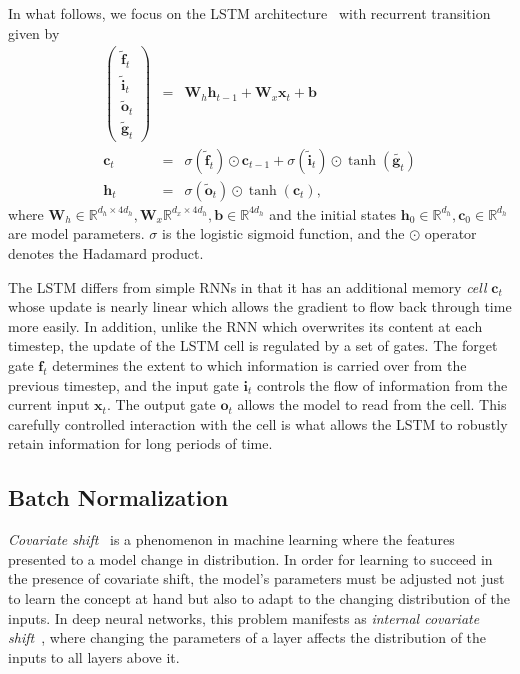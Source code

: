 \documentclass{article} %
\newcommand{\vect}[1]{\mathbf{#1}}
\newcommand{\mat}[1]{\mathbf{#1}}
\newcommand{\ewprod}{\odot}
\newcommand{\reals}{\mathbb{R}}
\begin{document}
In what follows, we focus on the LSTM architecture~\citep{lstm} with recurrent transition given by
\begin{eqnarray}
\left(\begin{array}{ccc}
\tilde{\vect{f}}_t \\
\tilde{\vect{i}}_t \\
\tilde{\vect{o}}_t \\
\tilde{\vect{g}}_t
\end{array}\right)
 &=&
 \mat{W}_h \vect{h}_{t-1} +
 \mat{W}_x \vect{x}_t +
 \vect{b}
 \\
\vect{c}_t &= &\sigma(\tilde{\vect{f}}_t) \ewprod \vect{c}_{t-1} +
\sigma(\tilde{\vect{i}}_t) \ewprod \tanh(\tilde{\vect{g}_t}) \\
\vect{h}_t &= &\sigma(\tilde{\vect{o}}_t) \ewprod \tanh(\vect{c}_t),
\end{eqnarray}
where $\vect{W}_h \in \reals^{d_h \times 4 d_h}, \vect{W}_x \reals^{d_x \times 4 d_h}, \vect{b} \in \reals^{4 d_h}$
and the initial states $\vect{h}_0 \in \reals^{d_h}, \vect{c}_0 \in \reals^{d_h}$ %
are model parameters.
$\sigma$ is the logistic sigmoid function, and the $\ewprod$ operator denotes the Hadamard product.

The LSTM differs from simple RNNs in that it has an additional memory \emph{cell} 
$\vect{c}_t$ whose update is nearly linear which allows the gradient to flow back 
through time more easily. In addition, unlike the RNN which overwrites its content 
at each timestep, the update of the LSTM cell is regulated by a set of gates.
The forget gate $\vect{f}_t$ determines the extent to which information is carried over from the previous timestep,
and the input gate $\vect{i}_t$ controls the flow of information from the current input $\vect{x}_t$.
The output gate $\vect{o}_t$ allows the model to read from the cell. This carefully 
controlled interaction with the cell is what allows the LSTM to robustly retain 
information for long periods of time.

\subsection{Batch Normalization}

\emph{Covariate shift}~\citep{shimodaira2000improving} is a phenomenon in machine learning where
the features presented to a model change in distribution.
In order for learning to succeed in the presence of covariate shift,
the model's parameters must be adjusted not just to learn the concept at hand
but also to adapt to the changing distribution of the inputs.
In deep neural networks, this problem manifests as \emph{internal covariate shift}~\citep{batchnorm},
where changing the parameters of a layer affects the distribution of the inputs to all layers above it.
\end{document}
